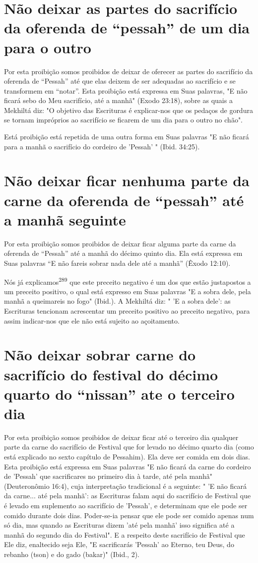 \section{Não deixar as partes do sacrifício da oferenda de ``pessah'' 
de um dia para o outro}

Por esta proibição somos proibidos de deixar de oferecer as partes do
sacrifício da oferenda de ``Pessah'' até que elas deixem de ser adequadas
ao sacrifício e se transformem em ``notar''. Esta proibição está expressa
em Suas palavras, "E não ficará sebo do Meu sacrifício, até a manhã"
(Exodo 23:18), sobre as quais a Mekhiltá diz: "O objetivo das Escrituras
é explicar-nos que os pedaços de gordura se tornam impróprios ao
sacrifício se ficarem de um dia para o outro no chão".

Está proibição está repetida de uma outra forma em Suas palavras "E não
ficará para a manhã o sacrifício do cordeiro de 'Pessah' " (Ibid.
34:25).

\section{Não deixar ficar nenhuma parte da carne da oferenda de ``pessah'' 
até a manhã seguinte}

Por esta proibição somos proibidos de deixar ficar alguma parte da carne
da oferenda de ``Pessah'' até a manhã do décimo quinto dia. Ela está
ex­pressa em Suas palavras ``E não fareis sobrar nada dele até a manhã''
(Êxodo 12:10).

Nós já explicamos\textsuperscript{289} que este preceito negativo é um
dos que es­tão justapostos a um preceito positivo, o qual está expresso
em Suas palavras "E a sobra dele, pela manhã a queimareis no fogo"
(Ibid.). A Mekhiltá diz: " 'E a sobra dele': as Escrituras tencionam
acrescentar um preceito positivo ao pre­ceito negativo, para assim
indicar-nos que ele não está sujeito ao açoitamento.

\section{Não deixar sobrar carne do sacrifício do festival do décimo
quarto do ``nissan'' ate o terceiro dia}

Por esta proibição somos proibidos de deixar ficar até o terceiro dia
qualquer parte da carne do sacrifício de Festival que for levado no
décimo quarto dia (como está explicado no sexto capítulo de Pessahim).
Ela deve ser comida em dois dias. Esta proibição está expressa em Suas
palavras "E não ficará da carne do cordeiro de 'Pessah' que sacrificares
no primeiro dia à tarde, até pela manhã" (Deuteronômio 16:4), cuja
interpretação tradicional é a seguinte: " 'E não ficará da carne... até
pela manhã': as Escrituras falam aqui do sacrifício de Festival que é
levado em suplemento ao sacrifício de 'Pessah', e determinam que ele
pode ser comido durante dois dias. Poder-se-ia pensar que ele pode ser
comido apenas num só dia, mas quando as Escrituras dizem 'até pela
manhã' isso significa até a manhã do segundo dia do Festival". E a
respeito deste sacri­fício de Festival que Ele diz, enaltecido seja Ele,
"E sacrificarás 'Pessah' ao Eter­no, teu Deus, do rebanho (tson) e do
gado (bakar)" (Ibid., 2).

